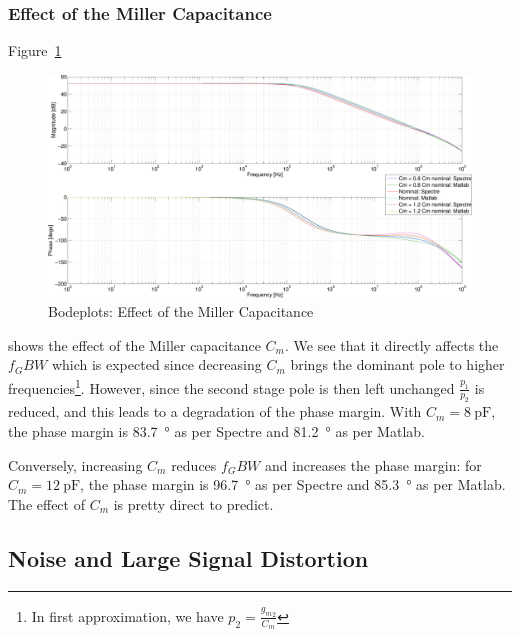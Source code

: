 \documentclass[english,10pt]{article}
\begin{document}
\subsubsection{Effect of the Miller Capacitance}
Figure~\ref{fig:cm}
\begin{figure}[htbp]
  \centering
  \includegraphics[width = \textwidth]{6_4.pdf}
  \caption{Bodeplots: Effect of the Miller Capacitance\label{fig:cm}}
\end{figure}
shows the effect of the Miller capacitance $C_m$. We see that it directly affects the $f_GBW$ which is expected since decreasing $C_m$ brings the dominant pole to higher frequencies\footnote{In first approximation, we have $p_2 = \frac{{g_m}_2}{C_m}$}. However, since the second stage pole is then left unchanged $\frac{p_1}{p_2}$ is reduced, and this leads to a degradation of the phase margin. With $C_m = \SI{8}{\pico\farad}$, the phase margin is \SI{83.7}{\degree} as per Spectre and \SI{81.2}{\degree} as per Matlab.

Conversely, increasing $C_m$ reduces $f_GBW$ and increases the phase margin: for $C_m = \SI{12}{\pico\farad}$, the phase margin is \SI{96.7}{\degree} as per Spectre and \SI{85.3}{\degree} as per Matlab. The effect of $C_m$ is pretty direct to predict.

\subsection{Noise and Large Signal Distortion}
\end{document}
